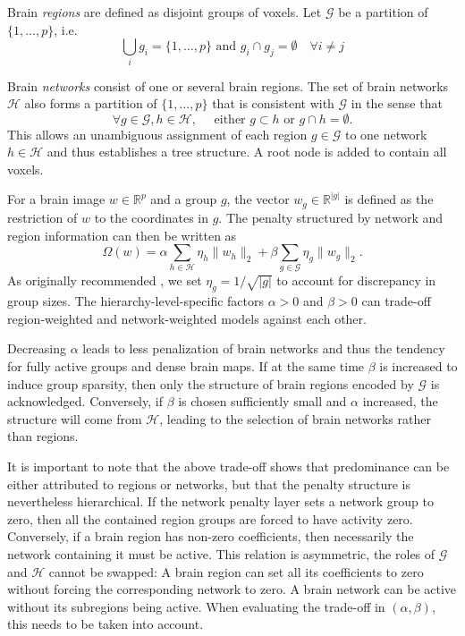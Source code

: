 \documentclass{article}
\newcommand{\R}{\mathbb{R}}
\begin{document}
Brain \textit{regions} are defined as disjoint groups of voxels. Let \(\mathcal G\)
be a partition of \(\{1, \dots, p\}\), i.e.
\[  \bigcup_{i} g_i = \{1, \dots, p\} \textrm{ and } g_i\cap g_j=\emptyset
\quad\forall i\not=j\]

Brain \textit{networks} consist of one or several brain regions.
The set of brain networks \(\mathcal{H}\) also forms a partition of 
\(\{1, \dots, p\}\) that is consistent with \(\mathcal G\) in
the sense that
\[\forall g\in\mathcal G, h\in\mathcal H,\quad
\textrm{ either } g\subset h\textrm{ or }g\cap h = \emptyset.\]
This allows an unambiguous assignment of each region \(g\in\mathcal G\) to one
network \(h\in\mathcal H\) and thus establishes a tree structure.
A root node is added to contain all voxels.

For a brain image \(w\in\R^p\) and a group \(g\), the vector 
\(w_g\in\R^{|g|}\) is defined as the restriction of \(w\) to the coordinates
 in \(g\). The penalty structured by network
and region information can then be written as
\[\Omega(w) = \alpha\sum_{h\in\mathcal H}\eta_h\|w_h\|_2 + \beta\sum_{g\in\mathcal G}\eta_g\|w_g\|_2.\]
As originally recommended \cite{yuan2006model},
we set \(\eta_g = 1/\sqrt{|g|}\) to
account for discrepancy in group sizes. The hierarchy-level-specific factors 
\(\alpha > 0\) and \(\beta > 0\) can trade-off region-weighted and
network-weighted models against each other.

Decreasing \(\alpha\) leads to less 
penalization of brain networks and thus the tendency for fully active groups
and dense brain maps. If at the same time \(\beta\) is increased to 
induce group sparsity, then only the structure of brain regions encoded
by \(\mathcal G\) is acknowledged. Conversely, if \(\beta\) is chosen 
sufficiently small and \(\alpha\) increased,
the structure will come from \(\mathcal H\), leading to the
selection of brain networks rather than regions.

It is important to note that the above trade-off shows that predominance
can be either attributed to regions or networks, but that the
penalty structure is nevertheless hierarchical.
If the network penalty layer sets a
network group to zero, then all the contained region groups are forced to
have activity zero. Conversely, if a brain region has non-zero coefficients,
then necessarily the network containing it must be active.
This relation is asymmetric, the roles of \(\mathcal G\) and \(\mathcal H\) 
cannot be swapped: A brain 
region can set all its coefficients to zero without forcing the 
corresponding network to zero. A brain network can be active without its
subregions being active.
When evaluating the trade-off in \((\alpha, \beta)\), this needs to be taken
into account.
\end{document}
